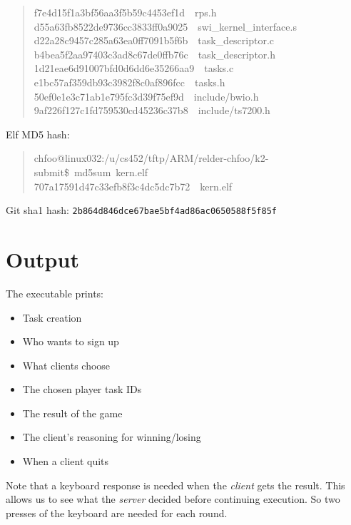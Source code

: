 \documentclass[letterpaper, 12pt]{article}
\begin{document}
\begin{quote}
{f7e4d15f1a3bf56aa3f5b59c4453ef1d~~rps.h\\
d55a63fb8522de9736cc3833ff0a9025~~swi\_kernel\_interface.s\\
d22a28c9457c285a63ea0ff7091b5f6b~~task\_descriptor.c\\
b4bea5f2aa97403c3ad8c67de0ffb76c~~task\_descriptor.h\\
1d21eae6d91007bfd0d6dd6e35266aa9~~tasks.c\\
e1bc57af359db93c3982f8c0af896fcc~~tasks.h\\
50ef0e1e3c71ab1e795fc3d39f75ef9d~~include/bwio.h\\
9af226f127c1fd759530cd45236c37b8~~include/ts7200.h
}
\end{quote}

Elf MD5 hash:
%
\begin{quote}{\ttfamily \raggedright \noindent
chfoo@linux032:/u/cs452/tftp/ARM/relder-chfoo/k2-submit\$~md5sum~kern.elf\\
707a17591d47c33efb8f3c4dc5dc7b72~~kern.elf
}
\end{quote}

Git sha1 hash: \texttt{2b864d846dce67bae5bf4ad86ac0650588f5f85f}


\section{Output%
  \label{output}%
}

The executable prints:
%
\begin{itemize}

\item Task creation

\item Who wants to sign up

\item What clients choose

\item The chosen player task IDs

\item The result of the game

\item The client's reasoning for winning/losing

\item When a client quits

\end{itemize}

Note that a keyboard response is needed when the \emph{client} gets the result. This allows us to see what the \emph{server} decided before continuing execution. So two presses of the keyboard are needed for each round.
\end{document}
